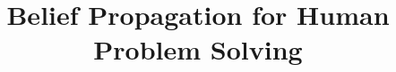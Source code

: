 \documentclass[12pt,a4paper]{article}
\theoremstyle{plain}
\theoremstyle{definition}
\theoremstyle{remark}
\begin{document}
\title{Belief Propagation for Human Problem Solving}
\author{}
\date{}
\maketitle


\newpage

\newpage
\footnotesize




\end{document}
